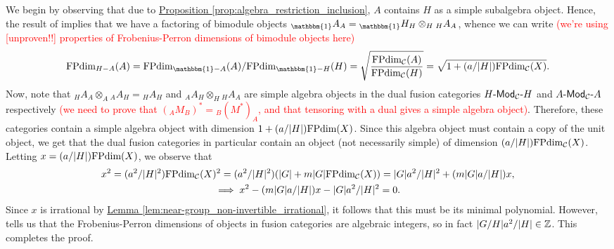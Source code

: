 \documentclass[12pt, reqno]{amsart}
\numberwithin{equation}{section}
\theoremstyle{plainspace}
\theoremstyle{definitionspace}
\theoremstyle{remarkspace}
\renewenvironment{proof}{{\noindent\textbf{Proof.}}}{\null\hfill\qedsymbol}
\DeclarePairedDelimiter{\abs}{\lvert}{\rvert}
\newcommand{\mathcat}[1]{\mathcal{#1}}
\newcommand{\textcat}[1]{\textup{\textsf{#1}}}
\newcommand{\bimodcat}[3][]{#2\textcat{-Mod}_{#1}\textcat{-}#3}
\newcommand{\FPdim}{\textup{FPdim}}
\begin{document}
\begin{proof}
We begin by observing that due to \hyperref[prop:algebra_restriction_inclusion]{Proposition \ref*{prop:algebra_restriction_inclusion}}, $A$ contains $H$ as a simple subalgebra object. Hence, the result of \cite[Exercise 7.8.22]{Etingof_2016} implies that we have a factoring of bimodule objects ${_{\mathbbm{1}}}A_A = {_{\mathbbm{1}}}H_H \otimes_H {_H}A_A$, whence we can write \textcolor{red}{(we're using [unproven!!] properties of Frobenius-Perron dimensions of bimodule objects here)}
\begin{align*}
\begin{split}
\FPdim_{H-A}(A) = \FPdim_{\mathbbm{1}-A}(A)/\FPdim_{\mathbbm{1}-H}(H) = \sqrt{\frac{\FPdim_{\mathcat{C}}(A)}{\FPdim_{\mathcat{C}}(H)}} = \sqrt{1 + (a/\abs{H})\FPdim_{\mathcat{C}}(X)}.
\end{split}
\end{align*}
\noindent Now, note that ${_H}A_A \otimes_A {_A}A_H = {_H}A_H$ and ${_A}A_H \otimes_H {_H}A_A$ are simple algebra objects in the dual fusion categories $\bimodcat[\mathcat{C}]{H}{H}$ and $\bimodcat[\mathcat{C}]{A}{A}$ respectively \textcolor{red}{(we need to prove that $({_A}M_B)^{*} = {_B}(M^{*})_A$, and that tensoring with a dual gives a simple algebra object)}. Therefore, these categories contain a simple algebra object with dimension $1 + (a/\abs{H})\FPdim(X)$. Since this algebra object must contain a copy of the unit object, we get that the dual fusion categories in particular contain an object (not necessarily simple) of dimension $(a/\abs{H})\FPdim_{\mathcat{C}}(X)$. Letting $x = (a/\abs{H})\FPdim(X)$, we observe that
\begin{gather*}
x^2 = (a^2/\abs{H}^2)\FPdim_{\mathcat{C}}(X)^2 = (a^2/\abs{H}^2)(\abs{G} + m\abs{G}\FPdim_{\mathcat{C}}(X)) = \abs{G}a^2/\abs{H}^2 + (m\abs{G}a/\abs{H})x, \\
\implies x^2 - (m\abs{G}a/\abs{H})x - \abs{G}a^2/\abs{H}^2 = 0.
\end{gather*}
\noindent Since $x$ is irrational by \hyperref[lem:near-group_non-invertible_irrational]{Lemma \ref*{lem:near-group_non-invertible_irrational}}, it follows that this must be its minimal polynomial. However, \cite[Corollary 8.54]{Etingof_2005} tells us that the Frobenius-Perron dimensions of objects in fusion categories are algebraic integers, so in fact $\abs{G/H}a^2/\abs{H} \in \mathbb{Z}$. This completes the proof.
\end{proof}
\newline
\end{document}
